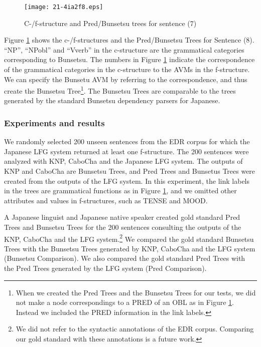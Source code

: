 \documentclass[english]{jnlp_1.4_rep}
\begin{document}
\begin{figure}[t] 
\begin{center}
\texttt{[image: 21-4ia2f8.eps]}
\end{center}
\caption{C-/f-structure and Pred/Bunsetsu trees for sentence (7)}
\label{paclic_fig5}
\end{figure}

Figure \ref{paclic_fig5} shows the c-/f-structures and the
Pred/Bunsetsu Trees for Sentence (8).  ``NP'', ``NPobl'' and ``Vverb''
in the c-structure are the grammatical categories corresponding to
Bunsetsu. The numbers in Figure \ref{paclic_fig5} indicate the
correspondence of the grammatical categories in the c-structure to the
AVMs in the f-structure.  We can specify the Bunsetu AVM by referring
to the correspondence, and thus create the Bunsetsu Tree\footnote{When we
  created the Pred Trees and the Bunsetsu Trees for our tests, we did
  not make a node correspondings to a PRED of an OBL as in Figure
  \ref{paclic_fig5}.  Instead we included the PRED information in the
  link labels.}.  The Bunsetsu Trees are comparable to the trees
generated by the standard Bunsetsu dependency parsers for Japanese.


\subsubsection{Experiments and results} 

We randomly selected 200 unseen sentences from the EDR corpus for
which the Japanese LFG system returned at least one f-structure.  The
200 sentences were analyzed with KNP, CaboCha and the Japanese LFG
system. The outputs of KNP and CaboCha are Bunsetsu Trees, and Pred
Trees and Bunsetus Trees were created from the outputs of the LFG
system.  In this experiment, the link labels in the trees are
grammatical functions as in Figure \ref{paclic_fig5}, and we omitted
other attributes and values in f-structures, such as TENSE and MOOD.

A Japanese linguist and Japanese native speaker created gold
standard Pred Trees and 
\linebreak
Bunsetsu Trees for the 200 sentences
consulting the outputs of the KNP, CaboCha and the LFG system.\footnote{We
  did not refer to the syntactic annotations of the EDR corpus.
  Comparing our gold standard with these annotations is a future work.}
We compared the gold standard Bunsetsu Trees with the Bunsetsu Trees
generated by KNP, CaboCha and the LFG system (Bunsetsu Comparison).
We also compared the gold standard Pred Trees with the Pred Trees
generated by the LFG system (Pred Comparison).
\end{document}
